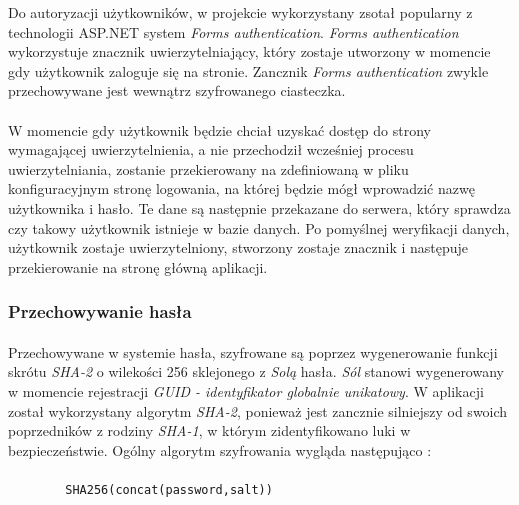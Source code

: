 Do autoryzacji użytkowników, w projekcie wykorzystany zsotał popularny z technologii ASP.NET system \textit{Forms authentication}. \textit{Forms authentication} wykorzystuje znacznik uwierzytelniający, który zostaje utworzony w momencie gdy użytkownik zaloguje się na stronie. Zancznik \textit{Forms authentication} zwykle przechowywane jest wewnątrz szyfrowanego ciasteczka.

\paragraph{} %
\label{par:}
W momencie gdy użytkownik będzie chciał uzyskać dostęp do strony wymagającej uwierzytelnienia, a nie przechodził wcześniej procesu uwierzytelniania, zostanie przekierowany na zdefiniowaną w pliku konfiguracyjnym stronę logowania, na której będzie mógł wprowadzić nazwę użytkownika i hasło. Te dane są następnie przekazane do serwera, który sprawdza czy takowy użytkownik istnieje w bazie danych. Po pomyślnej weryfikacji danych, użytkownik zostaje uwierzytelniony, stworzony zostaje znacznik i następuje przekierowanie na stronę główną aplikacji.

\subsubsection{Przechowywanie hasła}
\paragraph{} %
\label{par:}
Przechowywane w systemie hasła, szyfrowane są poprzez wygenerowanie funkcji skrótu \textit{SHA-2} o wilekości 256 sklejonego z \textit{Solą} hasła. \textit{Sól} stanowi wygenerowany w momencie rejestracji \textit{GUID - identyfikator globalnie unikatowy}. W aplikacji został wykorzystany algorytm \textit{SHA-2}, ponieważ jest zancznie silniejszy od swoich poprzedników z rodziny \textit{SHA-1}, w którym zidentyfikowano luki w bezpieczeństwie. Ogólny algorytm szyfrowania wygląda następująco :

\paragraph{} %
\label{par:}


\begin{lstlisting}
		SHA256(concat(password,salt))
\end{lstlisting}

